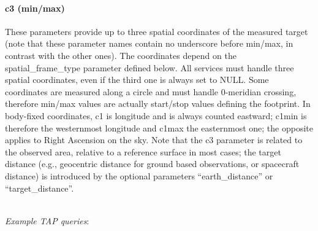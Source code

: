 \documentclass[11pt,a4paper]{ivoa}
\begin{document}
\paragraph{c3 (min/max)}
\vspace{-15pt}
These parameters provide up to three spatial coordinates of the measured
target (note that these parameter names contain no underscore before min/max, in contrast with the other ones).
The coordinates depend on the spatial\_frame\_type parameter
defined below. All services must handle three spatial coordinates,
even if the third one is always set to NULL. Some coordinates are
measured along a circle and must handle 0-meridian crossing, therefore
min/max values are actually start/stop values defining the footprint. In
body-fixed coordinates, c1 is longitude and is always counted eastward;
c1min is therefore the westernmost longitude and c1max the easternmost
one; the opposite applies to Right Ascension on the sky. Note that the
c3 parameter is related to the observed area, relative to a reference
surface in most cases; the target distance (e.g., geocentric distance
for ground based observations, or spacecraft distance) is introduced by
the optional parameters  ``earth\_distance'' or ``target\_distance''.

\textbf{\\}
\emph{Example TAP queries}:
\end{document}
